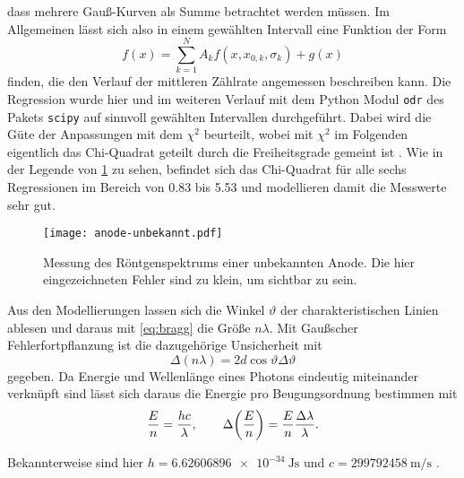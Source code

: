 dass mehrere Gauß-Kurven als Summe betrachtet werden müssen. Im Allgemeinen lässt sich also in einem 
gewählten Intervall eine Funktion der Form 
\begin{equation*}
	f(x) = \sum_{k=1}^N A_kf(x,x_{0,k}, \sigma_k) + g(x)
\end{equation*}
finden, die den Verlauf der mittleren Zählrate angemessen beschreiben kann. Die Regression wurde hier und im weiteren 
Verlauf mit dem Python 
Modul \verb|odr| des Pakets \verb|scipy| auf sinnvoll 
gewählten Intervallen durchgeführt. Dabei wird die Güte der Anpassungen mit dem $\chi^2$ beurteilt, 
wobei mit $\chi^2$ im Folgenden eigentlich das Chi-Quadrat geteilt durch die Freiheitsgrade gemeint ist 
\cite{wiki:reduced_chi_square}. Wie in der Legende von \cref{fig:anode-unbekannt-messung} zu sehen, befindet 
sich das Chi-Quadrat für alle sechs Regressionen im Bereich von \num{0.83} bis \num{5.53} und modellieren 
damit die Messwerte sehr gut.\par

\begin{figure}[htb]
	\centering
	\texttt{[image: anode-unbekannt.pdf]}
	\caption{Messung des Röntgenspektrums einer unbekannten Anode. Die hier eingezeichneten Fehler sind zu klein, um
	sichtbar zu sein.}
	\label{fig:anode-unbekannt-messung}
\end{figure}

Aus den Modellierungen lassen sich die Winkel $\vartheta$ der charakteristischen Linien ablesen und daraus mit 
\cref{eq:bragg} die Größe $n\lambda$. Mit Gaußscher Fehlerfortpflanzung \cite{wiki:fehlerfortpflanzung}
ist die dazugehörige Unsicherheit mit 
\begin{equation}
	\Delta(n\lambda) = 2d\cos\vartheta\Delta\vartheta
	\label{eq:bragg_uncertainty}
\end{equation}
gegeben. Da Energie und Wellenlänge eines Photons eindeutig miteinander verknüpft sind lässt sich daraus 
die Energie pro Beugungsordnung bestimmen mit
\begin{equation}
	\frac{E}{n} = \frac{hc}{\lambda}, \qquad \Delta\qty(\frac{E}{n}) = \frac{E}{n}\frac{\Delta\lambda}{\lambda}.
	\label{eq:energy_photon}
\end{equation}

Bekannterweise sind hier $h=\SI{6.62606896e-34}{\joule\second}$ und $c=\SI{299 792 458}{\meter\per\second}$ 
\cite{Demtröder:829119}.



